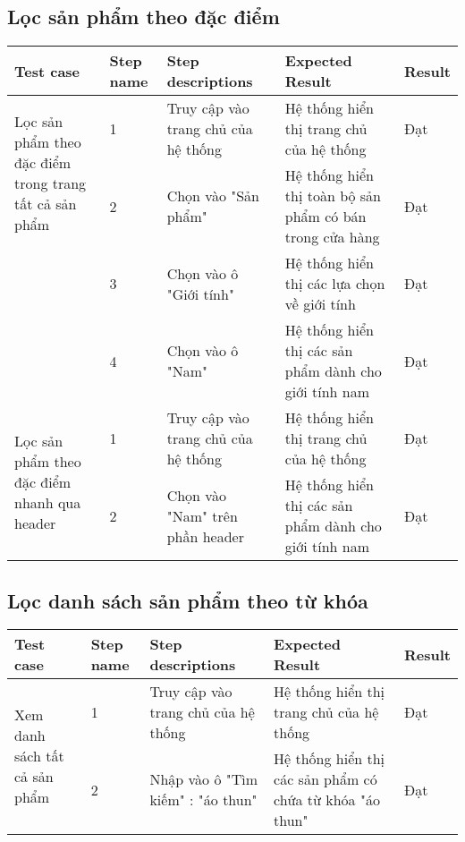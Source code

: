 \subsection{Lọc sản phẩm theo đặc điểm}
{
    \setlength\extrarowheight{6pt}
    \begin{longtable}{| p{2.5cm}| p{1cm}| p{5.5cm}| p{4.5cm} | p{1.5cm} |}
        \hline
        \textbf{Test case} & \textbf{Step name} & \textbf{Step descriptions} & \textbf{Expected Result} & \textbf{Result} \\
        \hline
        \multirow[t]{2}{2.5cm}{Lọc sản phẩm theo đặc điểm trong trang tất cả sản phẩm} & 
        1 & 
        Truy cập vào trang chủ của hệ thống & 
        Hệ thống hiển thị trang chủ của hệ thống & 
        Đạt \\
        \cline{2-5}
        & 2 & 
        Chọn vào "Sản phẩm" & 
        Hệ thống hiển thị toàn bộ sản phẩm có bán trong cửa hàng & 
        Đạt \\
        \cline{2-5}
         & 3 & 
         Chọn vào ô "Giới tính"& 
         Hệ thống hiển thị các lựa chọn về giới tính & 
         Đạt \\
        \cline{2-5}
         & 4 & 
         Chọn vào ô "Nam"& 
         Hệ thống hiển thị các sản phẩm dành cho giới tính nam & 
         Đạt \\
        \hline
        \multirow[t]{2}{2.5cm}{Lọc sản phẩm theo đặc điểm nhanh qua header} & 
        1 & 
        Truy cập vào trang chủ của hệ thống & 
        Hệ thống hiển thị trang chủ của hệ thống & 
        Đạt \\
        \cline{2-5}
        & 2 & 
        Chọn vào "Nam" trên phần header & 
         Hệ thống hiển thị các sản phẩm dành cho giới tính nam &  
         Đạt \\
        \hline
    \end{longtable}
}

\subsection{Lọc danh sách sản phẩm theo từ khóa}
{
    \setlength\extrarowheight{6pt}
    \begin{longtable}{| p{2.5cm}| p{1cm}| p{5.5cm}| p{4.5cm} | p{1.5cm} |}
        \hline
        \textbf{Test case} & \textbf{Step name} & \textbf{Step descriptions} & \textbf{Expected Result} & \textbf{Result} \\
        \hline
        \multirow[t]{2}{2.5cm}{Xem danh sách tất cả sản phẩm} & 
        1 & 
        Truy cập vào trang chủ của hệ thống & 
        Hệ thống hiển thị trang chủ của hệ thống & 
        Đạt \\
        \cline{2-5}
         & 2 & 
         Nhập vào ô "Tìm kiếm" : "áo thun" & 
         Hệ thống hiển thị các sản phẩm có chứa từ khóa "áo thun" & 
         Đạt \\
         \hline
    \end{longtable}
}

